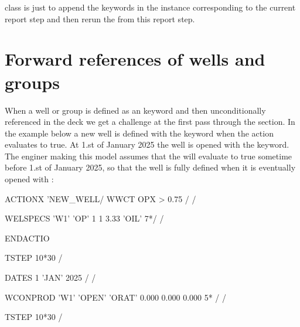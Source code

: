  class is just to append the \actionx{} keywords in the
 instance corresponding to the current report step and
then rerun the  from this report
step.



\section{Forward references of wells and groups}
When a well or group is defined as an \actionx{} keyword and then
unconditionally referenced in the deck we get a challenge at the first pass
through the  section. In the example below a new well  is
defined with the  keyword when the action 
evaluates to true. At 1.st of January 2025 the well  is opened with the
 keyword. The enginer making this model assumes that the
 will evaluate to true sometime before 1.st of January
2025, so that the well is fully defined when it is eventually opened with
:
\begin{deck}
ACTIONX
   'NEW_WELL/
   WWCT OPX  > 0.75 /
/

WELSPECS
  'W1'  'OP'  1 1 3.33  'OIL' 7*/
/

ENDACTIO

TSTEP
  10*30 /

DATES
   1 'JAN' 2025 /
/

WCONPROD
 'W1'      'OPEN'      'ORAT'      0.000      0.000      0.000  5* /
/

TSTEP
  10*30 /

\end{deck}

